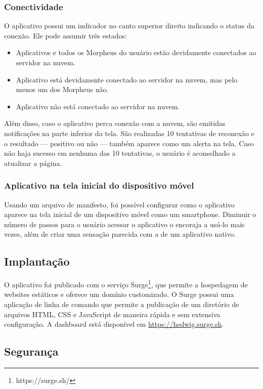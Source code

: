 \subsubsection{Conectividade}

O aplicativo possui um indicador no canto superior direito indicando o status da conexão. Ele pode assumir três estados:

\begin{itemize}
\item Aplicativos e todos os Morpheus do usuário estão devidamente conectados ao servidor na nuvem.
\item Aplicativo está devidamente conectado ao servidor na nuvem, mas pelo menos um dos Morpheus não.
\item Aplicativo não está conectado ao servidor na nuvem.
\end{itemize}

Além disso, caso o aplicativo perca conexão com a nuvem, são emitidas notificações na parte inferior da tela. São realizadas 10 tentativas de reconexão e o resultado --- positivo ou não --- também aparece como um alerta na tela. Caso não haja sucesso em nenhuma das 10 tentativas, o usuário é aconselhado a atualizar a página.

\subsubsection{Aplicativo na tela inicial do dispositivo móvel}

Usando um arquivo de manifesto, foi possível configurar como o aplicativo aparece na tela inicial de um dispositivo móvel como um smartphone. Diminuir o número de passos para o usuário acessar o aplicativo o encoraja a usá-lo mais vezes, além de criar uma sensação parecida com a de um aplicativo nativo.

\subsection{Implantação}

O aplicativo foi publicado com o serviço Surge\footnote{https://surge.sh/}, que permite a hospedagem de websites estáticos e oferece um domínio customizado. O Surge possui uma aplicação de linha de comando que permite a publicação de um diretório de arquivos HTML, CSS e JavaScript de maneira rápida e sem extensiva configuração. A dashboard está disponível em \url{https://hedwig.surge.sh}.

\subsection{Segurança}

